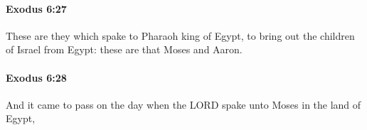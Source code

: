 		\paragraph{Exodus 6:27} %
			\label{EXODUS-6-27}

			These are they which spake to Pharaoh king of Egypt, to bring out the children of Israel from Egypt: these are that Moses and Aaron.


		\paragraph{Exodus 6:28} %
			\label{EXODUS-6-28}

			And it came to pass on the day when the LORD spake unto Moses in the land of Egypt,



